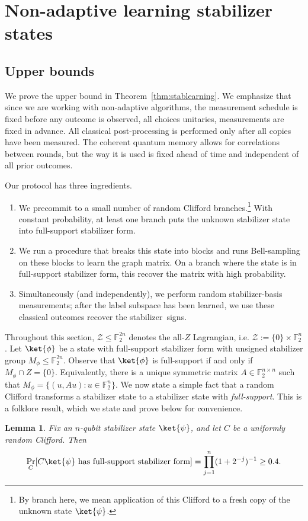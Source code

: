 \documentclass[11pt]{article}
\newtheorem{lemma}[theorem]{Lemma}
\newcommand{\F}{\mathbb{F}}
\begin{document}
\section{Non-adaptive learning stabilizer states}
\subsection{Upper bounds}
\label{sec:nonadaptive-upper}

We prove the upper bound in Theorem~\ref{thm:stablearning}. We emphasize that since we are working with non-adaptive algorithms, the measurement
schedule is fixed before any outcome is observed, all choices unitaries, measurements are fixed in advance.  All classical post-processing is performed only after all copies have been measured. The coherent quantum memory allows for correlations between rounds, but the way it is used is fixed ahead of time and independent of all prior outcomes.

Our protocol has three ingredients. 
\begin{enumerate}
    \item We precommit to a small number of
random Clifford branches.\footnote{By branch here, we mean application of this Clifford to a fresh copy of the unknown state $\ket{\psi}$.} With constant probability, at least one branch puts the unknown stabilizer state
into full-support stabilizer form. 
\item We run a procedure that breaks this state into blocks and runs Bell-sampling on these blocks to learn the graph matrix. On a branch where the state is in full-support stabilizer form, this recover the matrix with high probability.
\item Simultaneously (and independently), we perform  random stabilizer-basis measurements; after the label subspace has been learned, we use these classical outcomes recover the stabilizer~signs. 
\end{enumerate}
Throughout this section, $\mathcal{Z}\le \F_2^{2n}$ denotes the all-$Z$ Lagrangian,
i.e. $\mathcal{Z}:=\{0\}\times\F_2^n$.  Let  
$\ket{\phi}$ be a state with  full-support stabilizer form with unsigned stabilizer group
$M_\phi\le\F_2^{2n}$.  Observe that $\ket{\phi}$ is full-support if and only if 
$    M_\phi\cap Z=\{0\}.$ 
Equivalently, there is a unique symmetric matrix
$A\in\F_2^{n\times n}$ such that
$    M_\phi=\{(u,Au):u\in\F_2^n\}.$ 
 We now state a simple fact that a random Clifford transforms a stabilizer state to a stabilizer state with \emph{full-support}. This is a folklore result, which we state and prove below for convenience.
\begin{lemma}
\label{lem:random-clifford-full-support}
Fix an $n$-qubit stabilizer state $\ket{\psi}$, and let $C$ be a uniformly
random Clifford.  Then
$$
    \Pr_C[C\ket{\psi}\text{ has full-support stabilizer form}]
    =
    \prod_{j=1}^n(1+2^{-j})^{-1}
    \ge 0.4 .
$$
\end{lemma}
\end{document}

